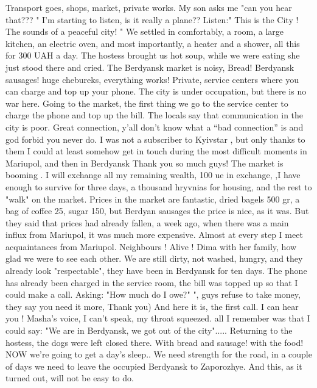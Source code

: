 Transport goes, shops, market, private works.
My son asks me "can you hear that??? "
I'm starting to listen, is it really a plane??
Listen:" This is the City ! The sounds of a peaceful city! "
We settled in comfortably, a room, a large kitchen, an electric oven, and most importantly, a heater and a shower, all this for 300 UAH a day.
The hostess brought us hot soup, while we were eating she just stood there and cried.
The Berdyansk market is noisy, Bread! Berdyansk sausages! huge chebureks, everything works! Private, service centers where you can charge and top up your phone.
The city is under occupation, but there is no war here.
Going to the market, the first thing we go to the service center to charge the phone and top up the bill.
The locals say that communication in the city is poor.
Great connection, y’all don’t know what a “bad connection” is and god forbid you never do.
I was not a subscriber to Kyivstar , but only thanks to them I could at least somehow get in touch during the most difficult moments in Mariupol, and then in Berdyansk
Thank you so much guys!
The market is booming .
I will exchange all my remaining wealth, 100 ue in exchange,
,I have enough to survive for three days, a thousand hryvnias for housing, and the rest to "walk" on the market.
Prices in the market are fantastic, dried bagels 500 gr, a bag of coffee 25, sugar 150, but Berdyan sausages the price is nice, as it was.
But they said that prices had already fallen, a week ago, when there was a main influx from Mariupol, it was much more expensive.
Almost at every step I meet acquaintances from Mariupol.
Neighbours ! Alive !
Dima with her family, how glad we were to see each other. We are still dirty, not washed, hungry, and they already look "respectable", they have been in Berdyansk for ten days.
The phone has already been charged in the service room, the bill was topped up so that I could make a call. Asking: "How much do I owe?" ", guys refuse to take money, they say you need it more,
Thank you)
And here it is, the first call. I can hear you ! Masha's voice, I can't speak, my throat squeezed. all I remember was that I could say: "We are in Berdyansk, we got out of the city".....
Returning to the hostess, the dogs were left closed there.
With bread and sausage! with the food!
NOW we're going to get a day's sleep..
We need strength for the road, in a couple of days we need to leave the occupied Berdyansk to Zaporozhye.
And this, as it turned out, will not be easy to do.
